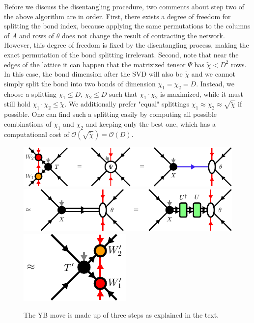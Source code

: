 Before we discuss the disentangling procedure, two comments about step two of the above algorithm are in order. First, there exists a degree of freedom for splitting the bond index, because applying the same permutations to the columns of $A$ and rows of $\theta$ does not change the result of contracting the network. However, this degree of freedom is fixed by the disentangling process, making the exact permutation of the bond splitting irrelevant. Second, note that near the edges of the lattice it can happen that the matrizized tensor $\Psi$ has $\tilde{\chi} < D^2$ rows. In this case, the bond dimension after the SVD will also be $\tilde{\chi}$ and we cannot simply split the bond into two bonds of dimension $\chi_1=\chi_2=D$. Instead, we choose a splitting $\chi_1 \le D$, $\chi_2 \le D$ such that $\chi_1\cdot\chi_2$ is maximized, while it must still hold $\chi_1\cdot\chi_2\le\tilde{\chi}$. We additionally prefer "equal" splittings $\chi_1\approx\chi_2\approx\sqrt{\tilde{\chi}}$ if possible. One can find such a splitting easily by computing all possible combinations of $\chi_1$ and $\chi_2$ and keeping only the best one, which has a computational cost of $\mathcal{O}\left(\sqrt{\tilde{\chi}}\right) = \mathcal{O}\left(D\right)$. \par
\begin{figure}
	\centering
	\subcaptionbox{\label{fig:yb_move_svd_disent_a}}
	{%
		\includegraphics[scale=1.0]{figures/tikz/disoTPS/yang_baxter_move_svd/yang_baxter_move_svd_a.pdf}
	}
	\subcaptionbox{\label{fig:yb_move_svd_disent_b}}
	{%
		\includegraphics[scale=1.0]{figures/tikz/disoTPS/yang_baxter_move_svd/yang_baxter_move_svd_b.pdf}
	}
	\subcaptionbox{\label{fig:yb_move_svd_disent_c}}
	{%
		\includegraphics[scale=1.0]{figures/tikz/disoTPS/yang_baxter_move_svd/yang_baxter_move_svd_c.pdf}
	}
	\caption{The YB move is made up of three steps as explained in the text.}
	\label{fig:yb_move_svd_disent}
\end{figure}
